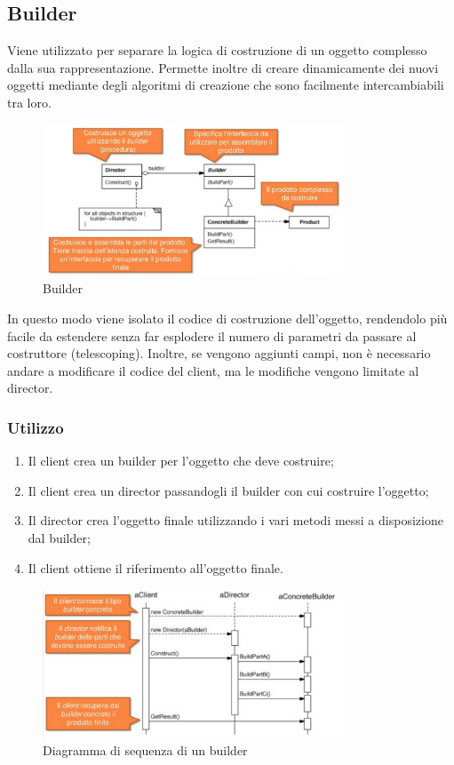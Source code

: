 \subsection{Builder}
Viene utilizzato per separare la logica di costruzione di un oggetto complesso dalla sua rappresentazione. Permette inoltre di creare dinamicamente dei nuovi oggetti mediante degli algoritmi di creazione che sono facilmente intercambiabili tra loro.

\begin{figure}[ht]
    \centering
    \includegraphics[width=0.8\textwidth]{immagini/builder.png}
    \caption{Builder}
\end{figure}
\FloatBarrier

In questo modo viene isolato il codice di costruzione dell'oggetto, rendendolo più facile da estendere senza far esplodere il numero di parametri da passare al costruttore (telescoping).
Inoltre, se vengono aggiunti campi, non è necessario andare a modificare il codice del client, ma le modifiche vengono limitate al director.
\subsubsection{Utilizzo}
\begin{enumerate}
\item Il client crea un builder per l'oggetto che deve costruire;
\item Il client crea un director passandogli il builder con cui costruire l'oggetto;
\item Il director crea l'oggetto finale utilizzando i vari metodi messi a disposizione dal builder;
\item Il client ottiene il riferimento all'oggetto finale.
\end{enumerate}
\begin{figure}[ht]
    \centering
    \includegraphics[width=0.8\textwidth]{immagini/builderSequence.png}
    \caption{Diagramma di sequenza di un builder}
\end{figure}
\FloatBarrier
